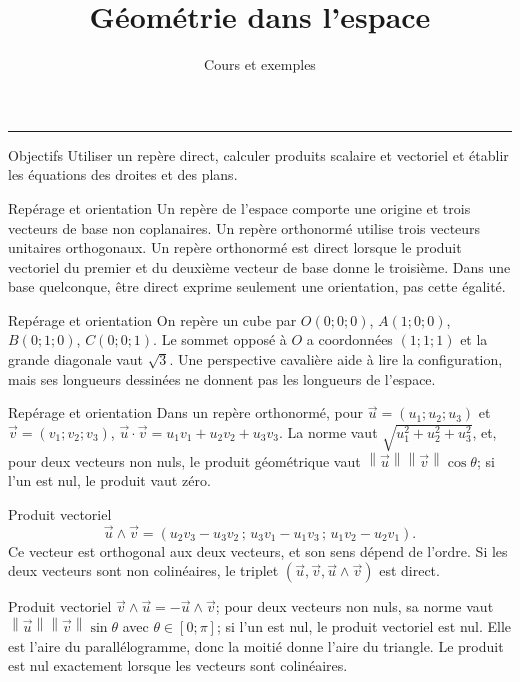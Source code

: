 \documentclass[aspectratio=169,10pt]{beamer}
\title{Géométrie dans l’espace}
\subtitle{Cours et exemples}
\date{}
\author{}
\begin{document}
\begin{frame}[plain]
\vfill
{\inserttitle\par}
\medskip
{\insertsubtitle\par}
\medskip
{\rule{\textwidth}{.5pt}}
\vfill
\end{frame}
\begin{frame}{Objectifs}
Utiliser un repère direct, calculer produits scalaire et vectoriel et établir les équations des droites et des plans.
\end{frame}
\begin{frame}{Repérage et orientation}
Un repère de l’espace comporte une origine et trois vecteurs de base non coplanaires. Un repère orthonormé utilise trois vecteurs unitaires orthogonaux. Un repère orthonormé est direct lorsque le produit vectoriel du premier et du deuxième vecteur de base donne le troisième. Dans une base quelconque, être direct exprime seulement une orientation, pas cette égalité.
\end{frame}
\begin{frame}{Repérage et orientation}
On repère un cube par \(O(0;0;0)\), \(A(1;0;0)\), \(B(0;1;0)\), \(C(0;0;1)\). Le sommet opposé à \(O\) a coordonnées \((1;1;1)\) et la grande diagonale vaut \(\sqrt3\). Une perspective cavalière aide à lire la configuration, mais ses longueurs dessinées ne donnent pas les longueurs de l’espace.
\end{frame}
\begin{frame}{Repérage et orientation}
Dans un repère orthonormé, pour \(\overrightarrow{u}=(u_1;u_2;u_3)\) et \(\overrightarrow{v}=(v_1;v_2;v_3)\), \(\overrightarrow{u}\cdot\overrightarrow{v}=u_1v_1+u_2v_2+u_3v_3\). La norme vaut \(\sqrt{u_1^2+u_2^2+u_3^2}\), et, pour deux vecteurs non nuls, le produit géométrique vaut \(\left\| \overrightarrow{u} \right\|\left\| \overrightarrow{v} \right\|\cos\theta\); si l’un est nul, le produit vaut zéro.
\end{frame}
\begin{frame}{Produit vectoriel}
\[
\overrightarrow{u}\wedge\overrightarrow{v}=(u_2v_3-u_3v_2\,;\,
 u_3v_1-u_1v_3\,;\,u_1v_2-u_2v_1).
\]
Ce vecteur est orthogonal aux deux vecteurs, et son sens dépend de l’ordre. Si les deux vecteurs sont non colinéaires, le triplet \((\overrightarrow{u},\overrightarrow{v},\overrightarrow{u}\wedge\overrightarrow{v})\) est direct.
\end{frame}
\begin{frame}{Produit vectoriel}
\(\overrightarrow{v}\wedge\overrightarrow{u}=-\overrightarrow{u}\wedge\overrightarrow{v}\); pour deux vecteurs non nuls, sa norme vaut \(\left\| \overrightarrow{u} \right\|\left\| \overrightarrow{v} \right\|\sin\theta\) avec \(\theta\in[0;\pi]\); si l’un est nul, le produit vectoriel est nul. Elle est l’aire du parallélogramme, donc la moitié donne l’aire du triangle. Le produit est nul exactement lorsque les vecteurs sont colinéaires.
\end{frame}
\end{document}
